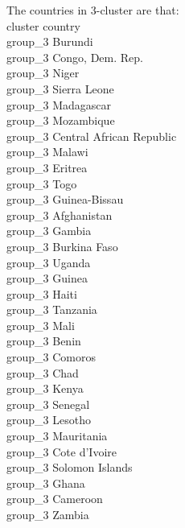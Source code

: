 \documentclass[12pt]{article}
\begin{document}
\begin{itemize}
\begin{enumerate}
      The countries in 3-cluster are that: \\
      cluster                      country\\
      group\_3                     Burundi\\
      group\_3            Congo, Dem. Rep.\\
      group\_3                       Niger\\
      group\_3                Sierra Leone\\
      group\_3                  Madagascar\\
      group\_3                  Mozambique\\
      group\_3    Central African Republic\\
      group\_3                      Malawi\\
      group\_3                     Eritrea\\
      group\_3                        Togo\\
      group\_3               Guinea-Bissau\\
      group\_3                 Afghanistan\\
      group\_3                      Gambia\\
      group\_3                Burkina Faso\\
      group\_3                      Uganda\\
      group\_3                      Guinea\\
      group\_3                       Haiti\\
      group\_3                    Tanzania\\
      group\_3                        Mali\\
      group\_3                       Benin\\
      group\_3                     Comoros\\
      group\_3                        Chad\\
      group\_3                       Kenya\\
      group\_3                     Senegal\\
      group\_3                     Lesotho\\
      group\_3                  Mauritania\\
      group\_3               Cote d'Ivoire\\
      group\_3             Solomon Islands\\
      group\_3                       Ghana\\
      group\_3                    Cameroon\\
      group\_3                      Zambia\\


\end{enumerate}
\end{itemize}
\end{document}
